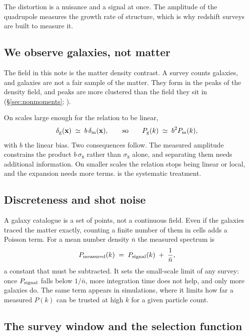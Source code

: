 \documentclass[12pt]{article}
\newcommand{\bx}{\mathbf{x}}
\begin{document}
The distortion is a nuisance and a signal at once.  The amplitude of the
quadrupole measures the growth rate of structure, which is why redshift
surveys are built to measure it.

\subsection{We observe galaxies, not matter}
\label{sec:bias}

The field in this note is the matter density contrast.  A survey counts
galaxies, and galaxies are not a fair sample of the matter.  They form in
the peaks of the density field, and peaks are more clustered than the
field they sit in (\S\ref{sec:nonmoments}; \citealt{BBKS1986}).

On scales large enough for the relation to be linear,
\begin{equation}
  \delta_{\rm g}(\bx) \;\simeq\; b\,\delta_{\rm m}(\bx),
  \qquad\text{so}\qquad
  P_{\rm g}(k) \;\simeq\; b^2 P_{\rm m}(k),
  \label{eq:bias}
\end{equation}
with $b$ the linear bias.  Two consequences follow.  The measured
amplitude constrains the product $b\,\sigma_8$ rather than $\sigma_8$
alone, and separating them needs additional information.  On smaller
scales the relation stops being linear or local, and the expansion needs
more terms.  \citet{Desjacques2018} is the systematic treatment.

\subsection{Discreteness and shot noise}
\label{sec:shotnoise}

A galaxy catalogue is a set of points, not a continuous field.  Even if
the galaxies traced the matter exactly, counting a finite number of them
in cells adds a Poisson term.  For a mean number density $\bar n$ the
measured spectrum is
\begin{equation}
  P_{\rm measured}(k) \;=\; P_{\rm signal}(k) \;+\; \frac{1}{\bar n},
  \label{eq:shot}
\end{equation}
a constant that must be subtracted.  It sets the small-scale limit of any
survey: once $P_{\rm signal}$ falls below $1/\bar n$, more integration
time does not help, and only more galaxies do.  The same term appears in
simulations, where it limits how far a measured $P(k)$ can be trusted at
high $k$ for a given particle count.

\subsection{The survey window and the selection function}
\label{sec:window}
\end{document}
